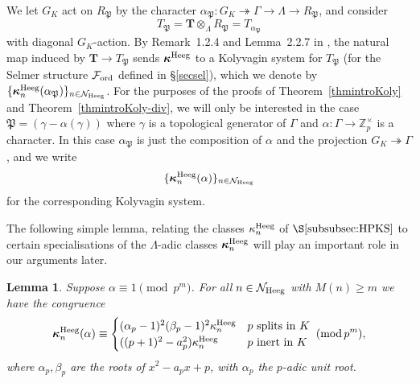 \documentclass[10pt,reqno]{amsart}
\numberwithin{equation}{section}
\theoremstyle{plain}
\theoremstyle{definition}
\theoremstyle{definition}
\theoremstyle{plain}
\theoremstyle{plain}
\newtheorem{lemma}[thm]{Lemma}
\theoremstyle{plain}
\theoremstyle{plain}
\theoremstyle{plain}
\theoremstyle{plain}
\newcommand{\Z}{\mathbb{Z}}
\newcommand{\p}{\mathfrak{P}}
\newcommand{\bkappa}{\boldsymbol{\kappa}}
\newcommand{\Fcal}{\mathcal{F}}
\newcommand{\cN}{\mathcal{N}}
\newcommand{\rH}{\mathrm{H}}
\begin{document}
We let $G_K$ act on $R_\p$ by the character $\alpha_{\p}: G_K\twoheadrightarrow \Gamma \to \Lambda\to R_\p$, and consider
\[
T_\p = \mathbf{T}\otimes_\Lambda R_\p = T_{\alpha_\p}
\]
with diagonal $G_K$-action. By Remark~1.2.4 and Lemma~2.2.7 in \cite{howard}, the natural map induced by $\mathbf{T}\to T_\p$ sends $\bkappa^{\rm Heeg}$ to a Kolyvagin system for $T_\p$ (for the Selmer structure $\Fcal_{\rm ord}$ defined in \S\ref{secsel}), which we denote by $\{\bkappa_{n}^{\rm Heeg}(\alpha_\p)\}_{n\in \cN_{\rm Heeg}}$. 
%
%
For the purposes of the proofs of Theorem~\ref{thmintroKoly} and Theorem~\ref{thmintroKoly-div}, we will only be 
interested in the case $\mathfrak{P} = (\gamma - \alpha(\gamma))$ where $\gamma$ is a topological generator of $\Gamma$ and 
$\alpha:\Gamma \rightarrow \Z_p^\times$ is a character. 
In this case $\alpha_\p$ is just the composition of $\alpha$ and the projection $G_K\twoheadrightarrow\Gamma$, and we write
\[
\{\bkappa_{n}^{\rm Heeg}(\alpha)\}_{n\in\mathcal{N}_{\rm Heeg}}
\]
for the corresponding Kolyvagin system.

The following simple lemma, relating the classes $\kappa_n^{\rm Heeg}$ of $\S\ref{subsubsec:HPKS}$ to certain specialisations of the $\Lambda$-adic classes $\boldsymbol{\kappa}_n^{\rm Heeg}$ will play an important role in our arguments later.

\begin{lemma}\label{lemmacongruence}
Suppose $\alpha\equiv 1\pmod{p^m}$.
For all $n\in\mathcal{N}_{\rm Heeg}$ with $M(n)\geq m$ we have the congruence
\[
\bkappa_{n}^{\rm Heeg}(\alpha)\equiv 
\begin{cases} (\alpha_p-1)^2(\beta_p-1)^2 \kappa_n^{\rm Heeg} & \text{$p$ splits in $K$} \\ 
((p+1)^2-a_p^2) \kappa_n^{\rm Heeg} & \text{$p$ inert in $K$}\end{cases} \;({\rm mod}\,p^m),
\]
where $\alpha_p,\beta_p$ are the roots of %
$x^2-a_px+p$, with $\alpha_p$ the $p$-adic unit root.
\end{lemma} 
\end{document}
